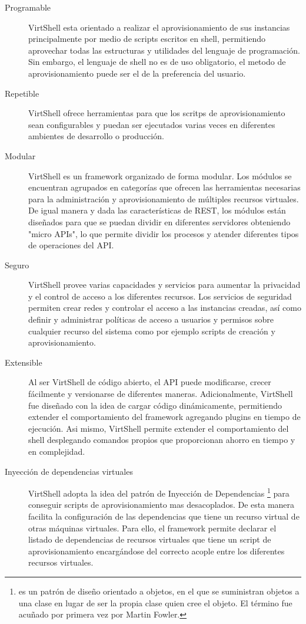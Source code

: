 \begin{description}
\item [Programable] VirtShell esta orientado a realizar el aprovisionamiento de sus instancias principalmente por medio de scripts escritos en shell, permitiendo aprovechar todas las estructuras y utilidades del lenguaje de programación. Sin embargo, el lenguaje de shell no es de uso obligatorio, el  metodo de aprovisionamiento puede ser el de la preferencia del usuario. 
\item [Repetible] VirtShell ofrece herramientas para que los scritps de aprovisionamiento sean configurables y  puedan ser ejecutados varias veces en diferentes ambientes de desarrollo o producción.
\item [Modular] VirtShell es un framework organizado de forma modular. Los módulos se encuentran agrupados en categorías que ofrecen las herramientas necesarias para la administración y aprovisionamiento de múltiples recursos virtuales. De igual manera y dada las características de REST, los módulos están diseñados para que se puedan dividir en diferentes servidores obteniendo "micro APIs", lo que permite dividir los procesos y atender diferentes tipos de operaciones del API. 
\item [Seguro] VirtShell provee varias capacidades y servicios para aumentar la privacidad y el control de acceso a los diferentes recursos. Los servicios de seguridad permiten crear redes y controlar el acceso a las instancias creadas, así como definir y administrar políticas de acceso a usuarios y permisos sobre cualquier recurso del sistema como por ejemplo scripts de creación y aprovisionamiento.
\item [Extensible] Al ser VirtShell de código abierto, el API puede modificarse, crecer fácilmente y versionarse de diferentes maneras. Adicionalmente, VirtShell fue diseñado con la idea de cargar código dinámicamente, permitiendo extender el comportamiento del framework agregando plugins en tiempo de ejecución.  Asi mismo, VirtShell permite extender el comportamiento del shell desplegando comandos propios que proporcionan ahorro en tiempo y en complejidad.
\item [Inyección de dependencias virtuales] VirtShell adopta la idea del patrón de Inyección de Dependencias \footnote{es un patrón de diseño orientado a objetos, en el que se suministran objetos a una clase en lugar de ser la propia clase quien cree el objeto. El término fue acuñado por primera vez por Martin Fowler.} \cite{fowler04} para conseguir scripts de aprovisionamiento mas desacoplados. De esta manera facilita la configuración de las dependencias que tiene un recurso virtual de otras máquinas virtuales. Para ello, el framework permite declarar el listado de dependencias de recursos virtuales que tiene un script de aprovisionamiento encargándose del correcto acople entre los diferentes recursos virtuales.

\end{description}
